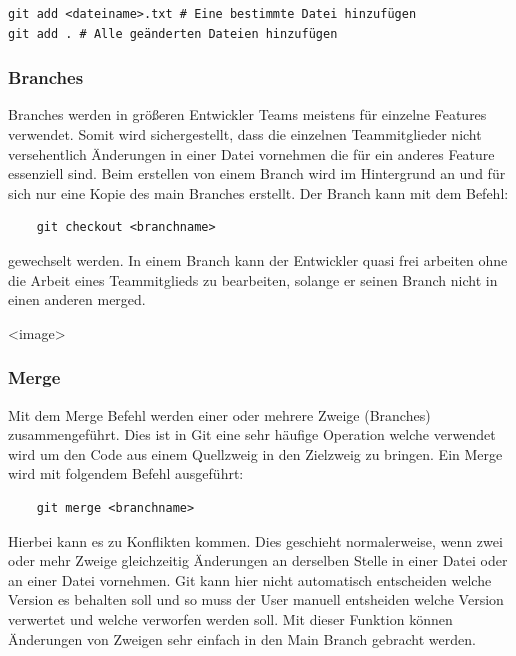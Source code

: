 \begin{verbatim}
git add <dateiname>.txt # Eine bestimmte Datei hinzufügen
git add . # Alle geänderten Dateien hinzufügen
\end{verbatim}

\subsubsection{Branches}

Branches werden in größeren Entwickler Teams meistens für einzelne Features verwendet. Somit wird sichergestellt, dass die einzelnen Teammitglieder nicht versehentlich Änderungen in einer Datei vornehmen die für ein anderes Feature essenziell sind. Beim erstellen von einem Branch wird im Hintergrund an und für sich nur eine Kopie des main Branches erstellt. Der Branch kann mit dem Befehl: 

\begin{verbatim}
    git checkout <branchname>
\end{verbatim}

gewechselt werden.
In einem Branch kann der Entwickler quasi frei arbeiten ohne die Arbeit eines Teammitglieds zu bearbeiten, solange er seinen Branch nicht in einen anderen merged.

<image>

\cite{Github_Branches}

\subsubsection{Merge}

Mit dem Merge Befehl werden einer oder mehrere Zweige (Branches) zusammengeführt. Dies ist in Git eine sehr häufige Operation welche verwendet wird um den Code aus einem Quellzweig in den Zielzweig zu bringen.
Ein Merge wird mit folgendem Befehl ausgeführt: 

\begin{verbatim}
    git merge <branchname>
\end{verbatim}

Hierbei kann es zu Konflikten kommen. Dies geschieht normalerweise, wenn zwei oder mehr Zweige gleichzeitig Änderungen an derselben Stelle in einer Datei oder an einer Datei vornehmen. Git kann hier nicht automatisch entscheiden welche Version es behalten soll und so muss der User manuell entsheiden welche Version verwertet und welche verworfen werden soll. Mit dieser Funktion können Änderungen von Zweigen sehr einfach in den Main Branch gebracht werden.

